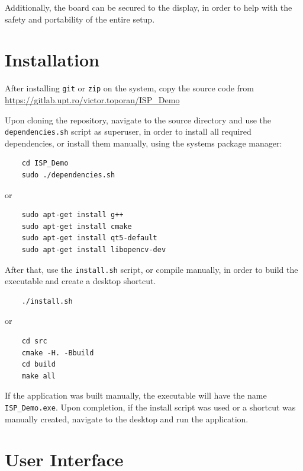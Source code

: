 Additionally, the board can be secured to the display, in order to help with the safety and portability of the
entire setup.

\section{Installation}

After installing \verb|git| or \verb|zip| on the system, copy the source code from
\url{https://gitlab.upt.ro/victor.toporan/ISP_Demo}

Upon cloning the repository, navigate to the source directory and use the \verb|dependencies.sh| script as superuser,
in order to install all required dependencies, or install them manually, using the systems package manager:
\begin{code}
	\begin{lstlisting}
    cd ISP_Demo
    sudo ./dependencies.sh
    \end{lstlisting}
	or
	\begin{lstlisting}
    sudo apt-get install g++
    sudo apt-get install cmake
    sudo apt-get install qt5-default
    sudo apt-get install libopencv-dev
    \end{lstlisting}
\end{code}

After that, use the \verb|install.sh| script, or compile manually, in order to build the executable and create
a desktop shortcut.

\begin{code}
	\begin{lstlisting}
    ./install.sh
    \end{lstlisting}
	or
	\begin{lstlisting}
    cd src
    cmake -H. -Bbuild
    cd build
    make all
    \end{lstlisting}
\end{code}

If the application was built manually, the executable will have the name \verb|ISP_Demo.exe|.
Upon completion, if the install script was used or a shortcut was manually created, navigate to the desktop and
run the application.

\pagebreak
\section{User Interface}


